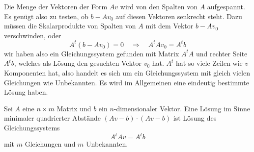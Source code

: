 Die Menge der Vektoren der Form $Av$ wird von den Spalten von $A$
aufgespannt.
Es genügt also zu testen, ob $b-Av_0$ auf diesen
Vektoren senkrecht steht.
Dazu müssen die Skalarprodukte von
Spalten von $A$ mit dem Vektor $b-Av_0$ verschwinden, oder
\[
A^t(b-Av_0)=0
\quad
\Rightarrow
\quad
A^tAv_0=A^tb
\]
wir haben also ein Gleichungssystem gefunden mit Matrix $A^tA$ und
rechter Seite $A^tb$, welches als Lösung den gesuchten Vektor
$v_0$ hat.
$A^t$ hat so viele Zeilen wie $v$ Komponenten hat, also
handelt es sich um ein Gleichungssystem mit gleich vielen Gleichungen
wie Unbekannten.
Es wird im Allgemeinen eine eindeutig bestimmte Lösung haben.

\begin{satz} Sei $A$ eine $n\times m$ Matrix und $b$ ein $n$-dimensionaler
Vektor.
Eine Lösung im Sinne minimaler quadrierter Abstände
$
(Av-b)\cdot(Av-b)
$
ist Lösung des Gleichungssystems
\[
A^tAv=A^tb
\]
mit $m$ Gleichungen und $m$ Unbekannten.
\end{satz}


